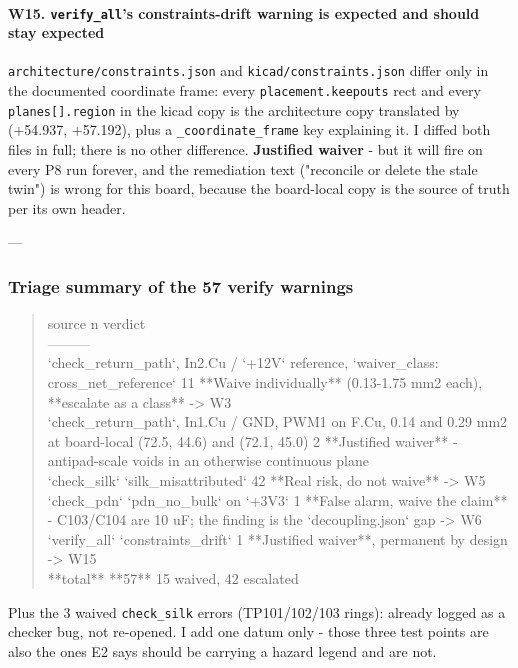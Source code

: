 \documentclass[11pt,a4paper]{article}
\begin{document}
\paragraph*{W15. \texttt{verify\_all}'s constraints-drift warning is expected and should stay expected}
\texttt{architecture/constraints.json} and \texttt{kicad/constraints.json} differ only in the documented coordinate frame: every \texttt{placement.keepouts} rect and every \texttt{planes{[}{]}.region} in the kicad copy is the architecture copy translated by (+54.937, +57.192), plus a \texttt{\_coordinate\_frame} key explaining it. I diffed both files in full; there is no other difference. \textbf{Justified waiver} - but it will fire on every P8 run forever, and the remediation text ("reconcile or delete the stale twin") is wrong for this board, because the board-local copy is the source of truth per its own header.

---

\subsubsection*{Triage summary of the 57 verify warnings}
\begin{quote}\small\ttfamily\raggedright
\textbar{} source \textbar{} n \textbar{} verdict \textbar{}\\
\textbar{}---\textbar{}---\textbar{}---\textbar{}\\
\textbar{} `check\_return\_path`, In2.Cu / `+12V` reference, `waiver\_class: cross\_net\_reference` \textbar{} 11 \textbar{} {*}{*}Waive individually{*}{*} (0.13-1.75 mm2 each), {*}{*}escalate as a class{*}{*} -\textgreater{} W3 \textbar{}\\
\textbar{} `check\_return\_path`, In1.Cu / GND, PWM1 on F.Cu, 0.14 and 0.29 mm2 at board-local (72.5, 44.6) and (72.1, 45.0) \textbar{} 2 \textbar{} {*}{*}Justified waiver{*}{*} - antipad-scale voids in an otherwise continuous plane \textbar{}\\
\textbar{} `check\_silk` `silk\_misattributed` \textbar{} 42 \textbar{} {*}{*}Real risk, do not waive{*}{*} -\textgreater{} W5 \textbar{}\\
\textbar{} `check\_pdn` `pdn\_no\_bulk` on `+3V3` \textbar{} 1 \textbar{} {*}{*}False alarm, waive the claim{*}{*} - C103/C104 are 10 uF; the finding is the `decoupling.json` gap -\textgreater{} W6 \textbar{}\\
\textbar{} `verify\_all` `constraints\_drift` \textbar{} 1 \textbar{} {*}{*}Justified waiver{*}{*}, permanent by design -\textgreater{} W15 \textbar{}\\
\textbar{} {*}{*}total{*}{*} \textbar{} {*}{*}57{*}{*} \textbar{} 15 waived, 42 escalated \textbar{}
\end{quote}
Plus the 3 waived \texttt{check\_silk} errors (TP101/102/103 rings): already logged as a checker bug, not re-opened. I add one datum only - those three test points are also the ones E2 says should be carrying a hazard legend and are not.
\end{document}
